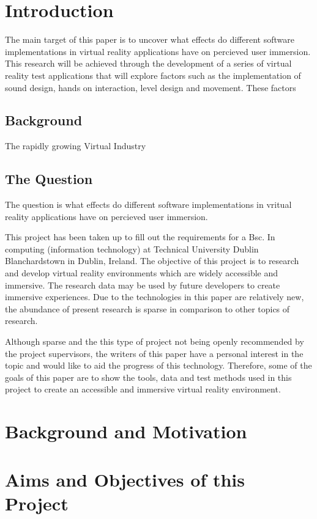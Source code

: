 \chapter{Introduction}
The main target of this paper is to uncover what effects do different software implementations in virtual reality applications have on percieved user immersion. This research will be achieved through the development of a series of virtual reality test applications that will explore factors such as the implementation of sound design, hands on interaction, level design and movement.
These factors

\section{Background}
The rapidly growing Virtual Industry
\section{The Question}
The question is what effects do different software implementations in vritual reality applications have on percieved user immersion. 



This project has been taken up to fill out the requirements for a Bsc. In computing (information technology) at Technical University Dublin Blanchardstown in Dublin, Ireland. The objective of this project is to research and develop virtual reality environments which are widely accessible and immersive. The research data may be used by future developers to create immersive experiences.  
Due to the technologies in this paper are relatively new, the abundance of present research is sparse in comparison to other topics of research. 

Although sparse and the this type of project not being openly recommended by the project supervisors, the writers of this paper have a personal interest in the topic and would like to aid the progress of this technology.  Therefore, some of the goals of this paper are to show the tools, data and test methods used in this project to create an accessible and immersive virtual reality environment. 

\chapter{Background and Motivation}

\chapter{Aims and Objectives of this Project}

